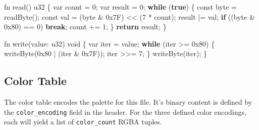 \documentclass[]{article}
\newenvironment{Shaded}{}{}
\newcommand{\BaseNTok}[1]{\textcolor[rgb]{0.25,0.63,0.44}{#1}}
\newcommand{\DataTypeTok}[1]{\textcolor[rgb]{0.56,0.13,0.00}{#1}}
\newcommand{\DecValTok}[1]{\textcolor[rgb]{0.25,0.63,0.44}{#1}}
\newcommand{\FunctionTok}[1]{\textcolor[rgb]{0.02,0.16,0.49}{#1}}
\newcommand{\KeywordTok}[1]{\textcolor[rgb]{0.00,0.44,0.13}{\textbf{#1}}}
\newcommand{\NormalTok}[1]{#1}
\newcommand{\OperatorTok}[1]{\textcolor[rgb]{0.40,0.40,0.40}{#1}}
\begin{document}
\begin{Shaded}
\begin{Highlighting}[]
\NormalTok{fn }\FunctionTok{read}\OperatorTok{()}\NormalTok{ u32 }\OperatorTok{\{}
    \DataTypeTok{var}\NormalTok{ count }\OperatorTok{=} \DecValTok{0}\OperatorTok{;}
    \DataTypeTok{var}\NormalTok{ result }\OperatorTok{=} \DecValTok{0}\OperatorTok{;}
    \KeywordTok{while} \OperatorTok{(}\KeywordTok{true}\OperatorTok{)} \OperatorTok{\{}
        \DataTypeTok{const} \DataTypeTok{byte} \OperatorTok{=} \FunctionTok{readByte}\OperatorTok{();}
        \DataTypeTok{const}\NormalTok{ val }\OperatorTok{=} \OperatorTok{(}\DataTypeTok{byte} \OperatorTok{\&} \BaseNTok{0x7F}\OperatorTok{)} \OperatorTok{\textless{}\textless{}} \OperatorTok{(}\DecValTok{7} \OperatorTok{*}\NormalTok{ count}\OperatorTok{);}
\NormalTok{        result }\OperatorTok{|=}\NormalTok{ val}\OperatorTok{;}
        \KeywordTok{if} \OperatorTok{((}\DataTypeTok{byte} \OperatorTok{\&} \BaseNTok{0x80}\OperatorTok{)} \OperatorTok{==} \DecValTok{0}\OperatorTok{)}
            \KeywordTok{break}\OperatorTok{;}
\NormalTok{        count }\OperatorTok{+=} \DecValTok{1}\OperatorTok{;}
    \OperatorTok{\}}
    \KeywordTok{return}\NormalTok{ result}\OperatorTok{;}
\OperatorTok{\}}

\NormalTok{fn }\FunctionTok{write}\OperatorTok{(}\NormalTok{value}\OperatorTok{:}\NormalTok{ u32}\OperatorTok{)} \DataTypeTok{void} \OperatorTok{\{}
    \DataTypeTok{var}\NormalTok{ iter }\OperatorTok{=}\NormalTok{ value}\OperatorTok{;}
    \KeywordTok{while} \OperatorTok{(}\NormalTok{iter }\OperatorTok{\textgreater{}=} \BaseNTok{0x80}\OperatorTok{)} \OperatorTok{\{}
        \FunctionTok{writeByte}\OperatorTok{(}\BaseNTok{0x80} \OperatorTok{|} \OperatorTok{(}\NormalTok{iter }\OperatorTok{\&} \BaseNTok{0x7F}\OperatorTok{));}
\NormalTok{        iter }\OperatorTok{\textgreater{}\textgreater{}=} \DecValTok{7}\OperatorTok{;}
    \OperatorTok{\}}
    \FunctionTok{writeByte}\OperatorTok{(}\NormalTok{iter}\OperatorTok{);}
\OperatorTok{\}}
\end{Highlighting}
\end{Shaded}

\hypertarget{color-table}{\subsection{Color Table}\label{color-table}}

The color table encodes the palette for this file. It's binary content
is defined by the \texttt{color\_encoding} field in the header. For the
three defined color encodings, each will yield a list of
\texttt{color\_count} RGBA tuples.
\end{document}
